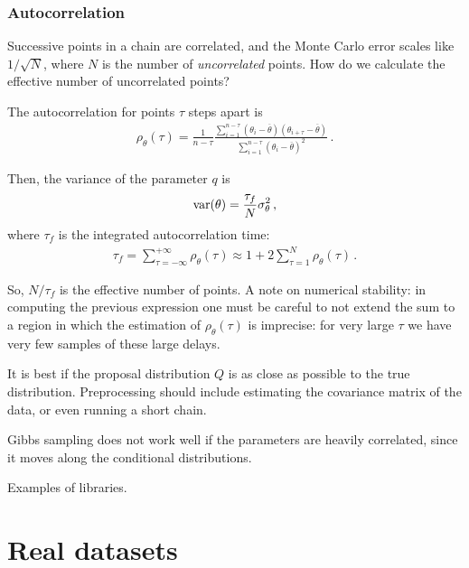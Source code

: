 \documentclass[main.tex]{subfiles}
\begin{document}
\subsection{Autocorrelation}


Successive points in a chain are correlated, and the Monte Carlo error scales like \(1/\sqrt{N}\), where \(N\) is the number of \emph{uncorrelated} points. 
How do we calculate the effective number of uncorrelated points? 

The autocorrelation for points \(\tau \) steps apart is 
%
\begin{align}
\rho_\theta (\tau ) = \frac{1}{n - \tau } \frac{\sum _{i=1}^{n-\tau } (\theta _i - \overline{\theta}) (\theta _{i+\tau } - \overline{\theta})}{\sum _{i=1}^{n-\tau } (\theta _i - \overline{\theta})^2}
\,.
\end{align}

Then, the variance of the parameter \(q\) is 
%
\begin{align}
\text{var} \qty(\theta ) = \frac{\tau _f}{N} \sigma_\theta^2
\,,
\end{align}
%
where \(\tau _f\) is the integrated autocorrelation time: 
%
\begin{align}
\tau _f = \sum _{\tau =- \infty }^{+ \infty } \rho _\theta (\tau )
\approx 1 + 2 \sum _{\tau = 1}^{N} \rho _\theta (\tau )
\,.
\end{align}

So, \(N / \tau _f\) is the effective number of points. 
A note on numerical stability: in computing the previous expression one must be careful to not extend the sum to a region in which the estimation of \(\rho _\theta (\tau )\) is imprecise: for very large \(\tau \) we have very few samples of these large delays.  

It is best if the proposal distribution \(Q\) is as close as possible to the true distribution. 
Preprocessing should include estimating the covariance matrix of the data, or even running a short chain.

Gibbs sampling does not work well if the parameters are heavily correlated, since it moves along the conditional distributions. 

Examples of libraries.

\chapter{Real datasets}
\end{document}
